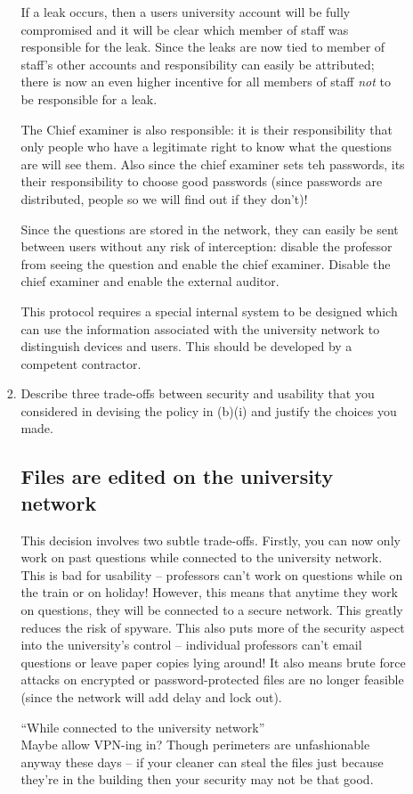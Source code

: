 \documentclass[10pt,\jkfside,a4paper]{article}
\begin{document}
\begin{enumerate}
\begin{enumerate}
\begin{enumerate}[label=(\roman*)]
If a leak occurs, then a users university account will be fully compromised and
it will be clear which member of staff was responsible for the leak. Since the
leaks are now tied to member of staff's other accounts and responsibility can easily be
attributed; there is now an even higher incentive for all members of staff \textit{not}
to be responsible for a leak.

The Chief examiner is also responsible: it is their responsibility that only people
who have a legitimate right to know what the questions are will see them. Also since the chief examiner sets teh
passwords, its their responsibility to choose good passwords (since passwords are distributed,
people so we will find out if they don't)!

Since the questions are stored in the network, they can easily be sent between users
without any risk of interception: disable the professor from seeing the question and
enable the chief examiner. Disable the chief examiner and enable the external auditor.

This protocol requires a special internal system to be designed which can use the
information associated with the university network to distinguish devices and users.
This should be developed by a competent contractor.

\item Describe three trade-offs between security and usability that you considered in 
devising the policy in (b)(i) and justify the choices you made.

\subsection*{Files are edited on the university network}

This decision involves two subtle trade-offs. Firstly, you can now only work
on past questions while connected to the university network. This is bad for
usability -- professors can't work on questions while on the train or on
holiday! However, this means that anytime they work on questions, they will
be connected to a secure network. This greatly reduces the risk of spyware.
This also puts more of the security aspect into the university's control --
individual professors can't email questions or leave paper copies lying
around! It also means brute force attacks on encrypted or password-protected
files are no longer feasible (since the network will add delay and lock out).

{\color{blue}
``While connected to the university network''\\
Maybe allow VPN-ing in? Though perimeters are unfashionable anyway these days -- if
your cleaner can steal the files just because they're in the building then your security
may not be that good.
}


\end{enumerate}
\end{enumerate}
\end{enumerate}
\end{document}
